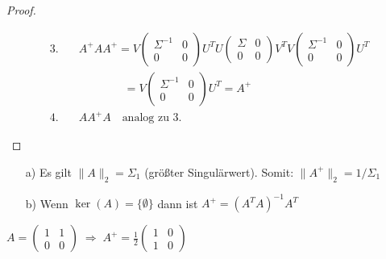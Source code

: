 \begin{proof}
\begin{enumerate}
\begin{align*}
     3. \quad & A^+ A A^+ = V \begin{pmatrix}\varSigma^{-1} & 0 \\ 0 & 0 \end{pmatrix} U^T
      U \begin{pmatrix}\varSigma & 0 \\ 0 & 0 \end{pmatrix} V^T
     V \begin{pmatrix}\varSigma^{-1} & 0 \\ 0 & 0 \end{pmatrix} U^T\\
     &\qquad \qquad = V \begin{pmatrix}\varSigma^{-1} & 0 \\ 0 & 0 \end{pmatrix} U^T = A^+\\
     4. \quad & A A^+ A \quad \text{analog zu 3.}
  \end{align*}
\end{enumerate}
\end{proof}

\begin{Bemerkungen}
 \begin{enumerate}
   \item [a)] Es gilt $\|A\|_2 = \varSigma_1$  (größter Singulärwert). Somit: $\|A^+\|_2 = 1 / \varSigma_1$
   \item [b)] Wenn $\ker(A) = \{ \emptyset \}$ dann ist $A^+ = (A^T A)^{-1} A^T$
 \end{enumerate}
\end{Bemerkungen}

\begin{Beispiel}
  $A = \begin{pmatrix} 1 & 1 \\ 0 & 0 \end{pmatrix} \; \Rightarrow \;
  A^+ = \frac{1}{2}\begin{pmatrix} 1 & 0 \\ 1 & 0 \end{pmatrix}$
\end{Beispiel}

